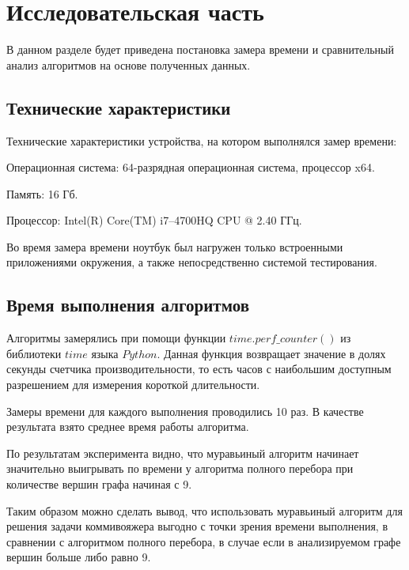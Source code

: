 \chapter{Исследовательская часть}

В данном разделе будет приведена постановка замера времени и сравнительный анализ алгоритмов на основе полученных данных.

\section{Технические характеристики}

Технические характеристики устройства, на котором выполнялся замер времени:

Операционная система: 64-разрядная операционная система, процессор x64.


Память: 16 Гб.


Процессор: Intel(R) Core(TM) i7--4700HQ CPU @ 2.40 ГГц.


Во время замера времени ноутбук был нагружен только встроенными приложениями окружения, а также непосредственно системой тестирования.

\section{Время выполнения алгоритмов}

Алгоритмы замерялись при помощи функции $time.perf\_counter()$ из библиотеки $time$ языка $Python$. Данная функция возвращает значение в долях секунды счетчика производительности, то есть часов с наибольшим доступным разрешением для измерения короткой длительности.

Замеры времени для каждого выполнения проводились 10 раз. В качестве результата взято среднее время работы алгоритма.

По результатам эксперимента видно, что муравьиный алгоритм начинает значительно выигрывать по времени у алгоритма полного перебора при количестве вершин графа начиная с 9.

Таким образом можно сделать вывод, что использовать муравьиный алгоритм для решения задачи коммивояжера выгодно с точки зрения времени выполнения, в сравнении с алгоритмом полного перебора, в случае если в анализируемом графе вершин больше либо равно 9.


\newpage

